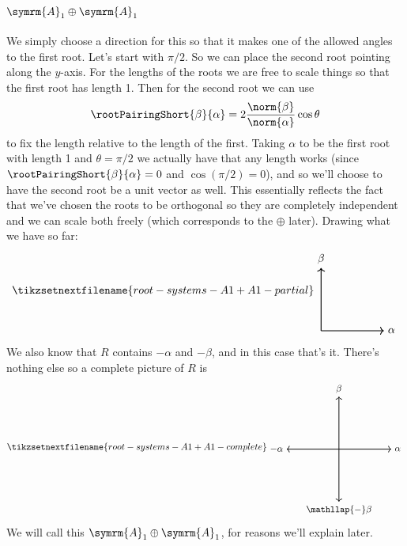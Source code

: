 \documentclass[fleqn]{NotesClass}
\newcommand{\dynkin}[2]{\symrm{#1}_{#2}}
\begin{document}
    \subsection{\texorpdfstring{\(\dynkin{A}{1} \oplus \dynkin{A}{1}\)}{A1 + A1}}
    We simply choose a direction for this so that it makes one of the allowed angles to the first root.
    Let's start with \(\pi/2\).
    So we can place the second root pointing along the \(y\)-axis.
    For the lengths of the roots we are free to scale things so that the first root has length 1.
    Then for the second root we can use
    \begin{equation}
        \rootPairingShort{\beta}{\alpha} = 2\frac{\norm{\beta}}{\norm{\alpha}} \cos \theta
    \end{equation}
    to fix the length relative to the length of the first.
    Taking \(\alpha\) to be the first root with length 1 and \(\theta = \pi/2\) we actually have that any length works (since \(\rootPairingShort{\beta}{\alpha} = 0\) and \(\cos (\pi/2) = 0\)), and so we'll choose to have the second root be a unit vector as well.
    This essentially reflects the fact that we've chosen the roots to be orthogonal so they are completely independent and we can scale both freely (which corresponds to the \(\oplus\) later).
    Drawing what we have so far:
    \begin{equation}
        \tikzsetnextfilename{root-systems-A1+A1-partial}
        \begin{tikzpicture}[baseline=(current bounding box)]
            \draw[->, thick] (0, 0) -- (2, 0) node [right] {\(\alpha\)};
            \draw[->, thick] (0, 0) -- (0, 2) node [above] {\(\beta\)};
        \end{tikzpicture}
    \end{equation}
    We also know that \(R\) contains \(-\alpha\) and \(-\beta\), and in this case that's it.
    There's nothing else so a complete picture of \(R\) is
    \begin{equation}
        \tikzsetnextfilename{root-systems-A1+A1-complete}
        \begin{tikzpicture}[baseline=(current bounding box)]
            \draw[->, thick] (0, 0) -- (2, 0) node [right] {\(\alpha\)};
            \draw[->, thick] (0, 0) -- (0, 2) node [above] {\(\beta\)};
            \draw[->, thick] (0, 0) -- (-2, 0) node [left] {\(-\alpha\)};
            \draw[->, thick] (0, 0) -- (0, -2) node [below] {\(\mathllap{-}\beta\)};
        \end{tikzpicture}
    \end{equation}
    We will call this \(\dynkin{A}{1} \oplus \dynkin{A}{1}\), for reasons we'll explain later.
    
\end{document}
